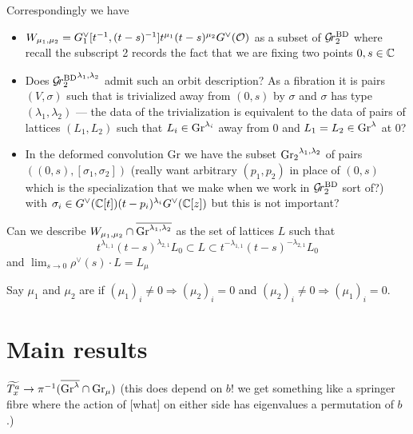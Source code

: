 \documentclass{article}
\begin{document}
Correspondingly we have 
\begin{itemize}
    \item $W_{\mu_1,\mu_2} = \Gch_1 [t^{-1},(t-s)^{-1}]t^{\mu_1} (t-s)^{\mu_2} \Gch(\cO)$ as a subset of $\Grbd[2]$ where recall the subscript 2 records the fact that we are fixing two points $0,s\in\CC$
    \item Does $\Grbd[2]^{\lambda_1,\lambda_2}$ admit such an orbit description? As a fibration it is pairs $(V,\sigma)$ such that is trivialized away from $(0,s)$ by $\sigma$ and $\sigma$ has type $(\lambda_1,\lambda_2)$ --- the data of the trivialization is equivalent to the data of pairs of lattices $(L_1,L_2)$ such that $L_i \in \Gr^{\lambda_i}$ away from $0$ and $L_1 = L_2\in\Gr^{\lambda}$ at 0?  
    \item In the deformed convolution Gr we have the subset $\Grc[2]^{\lambda_1,\lambda_2}$ of pairs $((0,s),[\sigma_1,\sigma_2])$ (really want arbitrary $(p_1,p_2)$ in place of $(0,s)$ which is the specialization that we make when we work in $\Grbd[2]$ sort of?) with $\sigma_i\in\Gch(\CC[t])(t-p_i)^{\lambda_i}\Gch(\CC[z])$ but this is not important? 
\end{itemize}

\begin{question}
    Can we describe $W_{\mu_1,\mu_2}\cap \overline{\Gr^{\lambda_1,\lambda_2}}$ as the set of lattices $L$ such that 
    \[
        t^{\lambda_{1,1}}(t-s)^{\lambda_{2,1}}L_0 \subset L \subset t^{-\lambda_{1,1}}(t-s)^{-\lambda_{2,1}}L_0
    \]
    and $\lim_{s\to 0} \rho^\vee (s)\cdot L = L_\mu$
\end{question}

\begin{definition}
    Say $\mu_1$ and $\mu_2$ are  if $(\mu_1)_i\ne 0 \Rightarrow (\mu_2)_i = 0$ and $(\mu_2)_i\ne 0 \Rightarrow (\mu_1)_i = 0$. 
\end{definition}


\section{Main results}

\begin{claim}
$\widetilde{T_x^a}\to\pi^{-1}(\overline{\Gr^\lambda}\cap\Gr_\mu)$ (this does depend on $b$! we get something like a springer fibre where the action of [what] on either side has eigenvalues a permutation of $b$.)
\end{claim}
\end{document}
